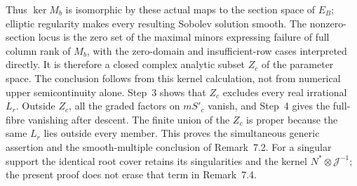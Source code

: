 Thus $\ker M_b$ is isomorphic by these actual maps to the section space of $E_B$; elliptic regularity makes every resulting Sobolev solution smooth. The nonzero-section locus is the zero set of the maximal minors expressing failure of full column rank of $M_b$, with the zero-domain and insufficient-row cases interpreted directly. It is therefore a closed complex analytic subset $Z_c$ of the parameter space. The conclusion follows from this kernel calculation, not from numerical upper semicontinuity alone. Step~3 shows that $Z_c$ excludes every real irrational $L_r$. Outside $Z_c$, all the graded factors on $mS'_c$ vanish, and Step~4 gives the full-fibre vanishing after descent. The finite union of the $Z_c$ is proper because the same $L_r$ lies outside every member. This proves the simultaneous generic assertion and the smooth-multiple conclusion of Remark~7.2. For a singular support the identical root cover retains its singularities and the kernel $N^*\otimes\mathcal J^{-1}$; the present proof does not erase that term in Remark~7.4.
